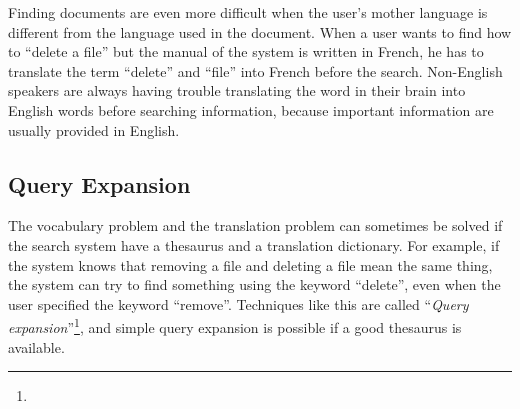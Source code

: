 \documentclass[manuscript,screen,review]{acmart}
\begin{document}

Finding documents are even more difficult when
the user's mother language is different from the language used in the document.
When a user wants to find how to ``delete a file'' but the
manual of the system is written in French,
he has to translate the term ``delete'' and ``file'' into French
before the search.
Non-English speakers are always having trouble
translating the word in their brain into English words
before searching information, because important information are
usually provided in English.


\subsection*{Query Expansion}

% 
%

The vocabulary problem and the translation problem can sometimes be solved
if the search system have a thesaurus and a translation dictionary.
%
For example, 
if the system knows that removing a file and deleting a file mean the same thing,
the system can try to find something using the keyword ``delete'',
even when the user specified the keyword ``remove''.
%
Techniques like this are called ``\textit{Query expansion}''\footnote{
},
and simple query expansion is possible if a good thesaurus is available.
\end{document}
